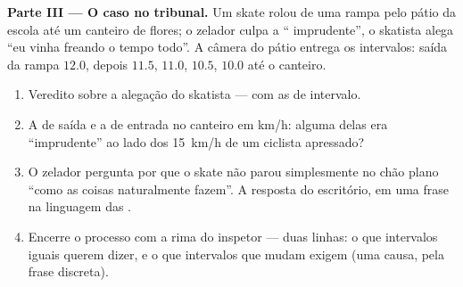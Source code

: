 \begin{problem}
\medskip\noindent\textbf{Parte III --- O caso no tribunal.}
Um skate rolou de uma rampa pelo pátio da escola até um canteiro de
flores; o zelador culpa a `` imprudente'', o skatista alega
``eu vinha freando o tempo todo''. A câmera do pátio entrega os
intervalos: saída da rampa $12.0$, depois $11.5$, $11.0$, $10.5$,
$10.0$ até o canteiro.
\begin{enumerate}[resume]
  \item Veredito sobre a alegação do skatista --- com as 
        de intervalo.
  \item A  de saída e a  de entrada no canteiro
        em \unit{km/h}: alguma delas era ``imprudente'' ao lado dos
        \qty{15}{km/h} de um ciclista apressado?
  \item O zelador pergunta por que o skate não parou simplesmente no
        chão plano ``como as coisas naturalmente fazem''. A resposta
        do escritório, em uma frase na linguagem das .
  \item Encerre o processo com a rima do inspetor --- duas linhas: o
        que intervalos iguais querem dizer, e o que intervalos que
        mudam exigem (uma causa, pela frase discreta).
\end{enumerate}
\end{problem}
